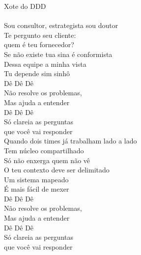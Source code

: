 \documentclass[12pt,play]{article}
\begin{document}
\scene

Xote do DDD \\
\\
Sou consultor, estrategista sou doutor \\
Te pergunto seu cliente: \\
quem é teu fornecedor? \\
Se não existe tua sina é conformista \\
Dessa equipe a minha vista \\
Tu depende sim sinhô \\

Dê Dê Dê \\
Não resolve os problemas, \\
Mas ajuda a entender \\

Dê Dê Dê \\
Só clareia as perguntas \\
que você vai responder \\

Quando dois times já trabalham lado a lado \\
Tem núcleo compartilhado \\
Só não enxerga quem não vê \\
O teu contexto deve ser delimitado \\
Um sistema mapeado \\
É mais fácil de mexer \\

Dê Dê Dê \\
Não resolve os problemas, \\
Mas ajuda a entender \\

Dê Dê Dê \\
Só clareia as perguntas \\
que você vai responder \\
\end{document}
